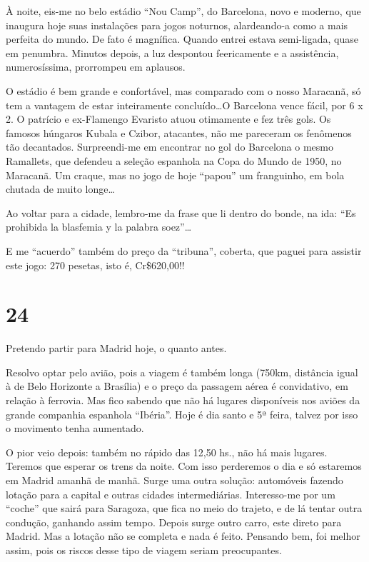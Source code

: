 À noite, eis-me no belo estádio “Nou Camp”, do Barcelona, novo e moderno, que inaugura hoje suas instalações para jogos noturnos, alardeando-a como a mais perfeita do mundo. De fato é magnífica. Quando entrei estava semi-ligada, quase em penumbra. Minutos depois, a luz despontou feericamente e a assistência, numerosíssima, prorrompeu em aplausos.

O estádio é bem grande e confortável, mas comparado com o nosso Maracanã, só tem a vantagem de estar inteiramente concluído\ldots O Barcelona vence fácil, por 6 x 2. O patrício e ex-Flamengo Evaristo atuou otimamente e fez três gols. Os famosos húngaros Kubala e Czibor, atacantes, não me pareceram os fenômenos tão decantados. Surpreendi-me em encontrar no gol do Barcelona o mesmo Ramallets, que defendeu a seleção espanhola na Copa do Mundo de 1950, no Maracanã. Um craque, mas no jogo de hoje “papou” um franguinho, em bola chutada de muito longe\ldots

Ao voltar para a cidade, lembro-me da frase que li dentro do bonde, na ida: “Es prohibida la blasfemia y la palabra soez”\ldots

E me “acuerdo” também do preço da “tribuna”, coberta, que paguei para assistir este jogo: 270 pesetas, isto é, Cr\$620,00!!

\section*{24 \adfflatleafright {}}
Pretendo partir para Madrid hoje, o quanto antes.

Resolvo optar pelo avião, pois a viagem é também longa (750km, distância igual à de Belo Horizonte a Brasília) e o preço da passagem aérea é convidativo, em relação à ferrovia. Mas fico sabendo que não há lugares disponíveis nos aviões da grande companhia espanhola “Ibéria”. Hoje é dia santo e 5ª feira, talvez por isso o movimento tenha aumentado.

O pior veio depois: também no rápido das 12,50 hs., não há mais lugares. Teremos que esperar os trens da noite. Com isso perderemos o dia e só estaremos em Madrid amanhã de manhã. Surge uma outra solução: automóveis fazendo lotação para a capital e outras cidades intermediárias. Interesso-me por um “coche” que sairá para Saragoza, que fica no meio do trajeto, e de lá tentar outra condução, ganhando assim tempo. Depois surge outro carro, este direto para Madrid. Mas a lotação não se completa e nada é feito. Pensando bem, foi melhor assim, pois os riscos desse tipo de viagem seriam preocupantes.

